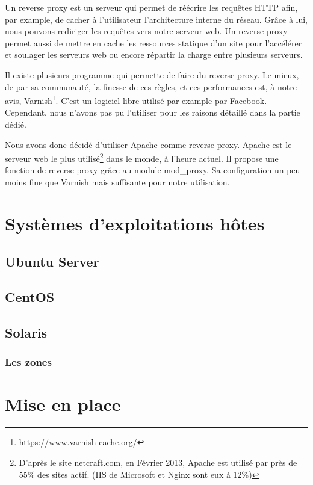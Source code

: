 \documentclass{report}
\begin{document}
Un reverse proxy est un serveur qui permet de réécrire les requêtes HTTP afin, par example, de cacher à l'utilisateur l'architecture interne du réseau. Grâce à lui, nous pouvons rediriger les requêtes vers notre serveur web.
Un reverse proxy permet aussi de mettre en cache les ressources statique d'un site pour l'accélérer et soulager les serveurs web ou encore répartir la charge entre plusieurs serveurs.

Il existe plusieurs programme qui permette de faire du reverse proxy. Le mieux, de par sa communauté, la finesse de ces règles, et ces performances est, à notre avis, Varnish\footnote{https://www.varnish-cache.org/}. C'est un logiciel libre utilisé par example par Facebook. Cependant, nous n'avons pas pu l'utiliser pour les raisons détaillé dans la partie dédié.

Nous avons donc décidé d'utiliser Apache comme reverse proxy. Apache est le serveur web le plus utilisé\footnote{D'après le site netcraft.com, en Février 2013, Apache est utilisé par près de 55\% des sites actif. (IIS de Microsoft et Nginx sont eux à 12\%)} dans le monde, à l'heure actuel. Il propose une fonction de reverse proxy grâce au module mod\_proxy. Sa configuration un peu moins fine que Varnish mais suffisante pour notre utilisation.


\chapter{Systèmes d'exploitations hôtes}
\section{Ubuntu Server}

\section{CentOS}

\section{Solaris}

\subsection{Les zones}



\chapter{Mise en place}
\end{document}
